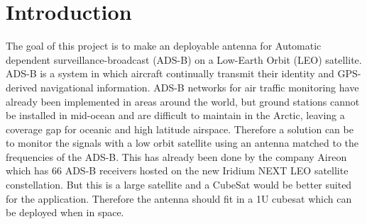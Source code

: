 \chapter{Introduction}\label{ch:introduction}
The goal of this project is to make an deployable antenna for Automatic dependent surveillance-broadcast (ADS-B) on a Low-Earth Orbit (LEO) satellite.
ADS-B is a system in which aircraft continually transmit their identity and GPS-derived navigational information. ADS-B networks for air traffic monitoring have already been implemented in areas around the world, but ground stations cannot be installed in mid-ocean and are difficult to maintain in the Arctic, leaving a coverage gap for oceanic and high latitude airspace. Therefore a solution can be to monitor the signals with a low orbit satellite using an antenna matched to the frequencies of the ADS-B. This has already been done by the company Aireon which has 66 ADS-B receivers hosted on the new Iridium NEXT LEO satellite constellation. But this is a large satellite and a CubeSat would be better suited for the application.   
Therefore the antenna should fit in a 1U cubesat which can be deployed when in space. 


